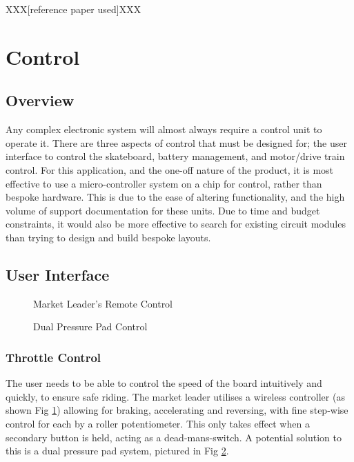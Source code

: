 \documentclass[journal,10pt]{IEEEtran}
\begin{document}
    
    XXX[reference paper used]XXX
    
\section{Control}
    \subsection{Overview}
    	Any complex electronic system will almost always require a control unit to operate it.
    	There are three aspects of control that must be designed for; the user interface to control the skateboard, battery management, and motor/drive train control.
    	For this application, and the one-off nature of the product, it is most effective to use a micro-controller system on a chip for control, rather than bespoke hardware.
    	This is due to the ease of altering functionality, and the high volume of support documentation for these units.
    	Due to time and budget constraints, it would also be more effective to search for existing circuit modules than trying to design and build bespoke layouts.
    \subsection{User Interface}
        \begin{figure}[H]
            \centering
            \caption{Market Leader's Remote Control}
            \label{fig:Boosted Remote}
        \end{figure}
        \begin{figure}[H]
            \centering
            \caption{Dual Pressure Pad Control}
            \label{fig:Pressure Pads}
        \end{figure}
            
    	\subsubsection{Throttle Control}
    		The user needs to be able to control the speed of the board intuitively and quickly, to ensure safe riding.
    		The market leader utilises a wireless controller (as shown Fig \ref{fig:Boosted Remote}) allowing for braking, accelerating and reversing, with fine step-wise control for each by a roller potentiometer.
    		This only takes effect when a secondary button is held, acting as a dead-mans-switch.
    		A potential solution to this is a dual pressure pad system, pictured in Fig \ref{fig:Pressure Pads}.
            
\end{document}
